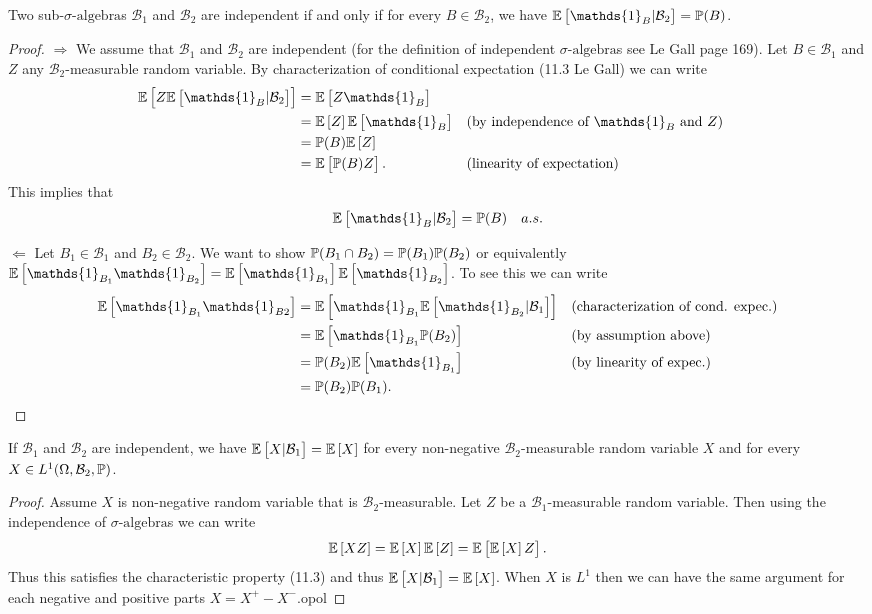 \begin{proposition}
	Two sub-$\sigma\text{-algebra}$s $ \mathcal{B}_1 $ and $ \mathcal{B}_2 $ are independent if and only if for every $ B \in \mathcal{B}_2 $, we have $ \E{\mathds{1}_B|\mathcal{B}_2} = \prob(B) $.
\end{proposition}
\begin{proof}
	$ \boxed{\Rightarrow} $ We assume that $ \mathcal{B}_1 $ and $ \mathcal{B}_2 $ are independent (for the definition of independent $\sigma\text{-algebra}$s see Le Gall page 169). Let $ B \in \mathcal{B}_1 $ and $ Z $ any $ \mathcal{B}_2 $-measurable random variable. By characterization of conditional expectation  (11.3 Le Gall) we can write
	\begin{align*}
		\E{Z\E{\mathds{1}_B|\mathcal{B}_2}} &= \E{Z\mathds{1}_B} \\
		&= \E{Z}\E{\mathds{1}_B} && \text{(by independence of $ \mathds{1}_B $ and $ Z $)} \\
		&= \prob(B) \E{Z} \\
		&= \E{\prob(B)Z}. && \text{(linearity of expectation)}
	\end{align*}
	This implies that 
	\[ \E{\mathds{1}_B|\mathcal{B}_2} = \prob(B) \quad a.s. \]
	
	\noindent $ \boxed{\Leftarrow} $ Let $ B_1 \in \mathcal{B}_1 $ and $ B_2 \in \mathcal{B}_2 $. We want to show $ \mathbb{P}(B_1\cap B_2) = \mathbb{P}(B_1) \mathbb{P}(B_2) $ or equivalently $ \E{\mathds{1}_{B_1} \mathds{1}_{B_2}} = \E{\mathds{1}_{B_1}} \E{\mathds{1}_{B_2}} $. To see this we can write
	\begin{align*}
		\E{\mathds{1}_{B_1} \mathds{1}_{B2}} &= \E{\mathds{1}_{B_1} \E{\mathds{1}_{B_2}|\mathcal{B}_1}}  && \text{(characterization of cond. expec.)} \\
		&=\E{\mathds{1}_{B_1} \prob(B_2)} && \text{(by assumption above)} \\
		&=\prob(B_2) \E{\mathds{1}_{B_1}} && \text{(by linearity of expec.)} \\
		&= \prob(B_2) \prob(B_1).
	\end{align*}
\end{proof}

\begin{proposition}
	If $ \mathcal{B}_1 $ and $ \mathcal{B}_2 $ are independent, we have $ \mathbb{E}\left[X|\mathcal{B}_1\right] = \mathbb{E}\left[X\right] $ for every non-negative $ \mathcal{B}_2 $-measurable random variable $ X $ and for every $ X \in L^1(\Omega,\mathcal{B}_2,\mathbb{P}) $.
\end{proposition}
\begin{proof}
	Assume $ X $ is non-negative random variable that is $ \mathcal{B}_2 $-measurable. Let $ Z $ be a $ \mathcal{B}_1 $-measurable random variable. Then using the independence of $\sigma\text{-algebra}$s we can write
	\[ \mathbb{E}\left[XZ\right] = \mathbb{E}\left[X\right]\mathbb{E}\left[Z\right] = \mathbb{E}\left[\mathbb{E}\left[X\right] Z\right]. \]
	Thus this satisfies the characteristic property (11.3) and thus $ \mathbb{E}\left[X|\mathcal{B}_1\right] = \mathbb{E}\left[X\right] $. When $ X $ is $ L^1 $ then we can have the same argument for each negative and positive parts $ X = X^+ - X^- $.opol
\end{proof}
